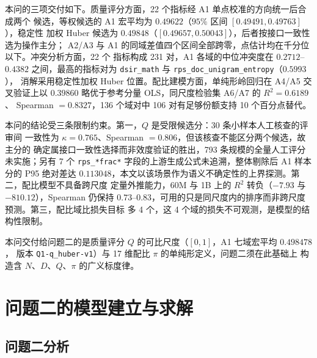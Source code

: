 \documentclass[bwprint]{gmcmthesis}
\numberwithin{equation}{section}
\numberwithin{figure}{section}
\numberwithin{table}{section}
\begin{document}
本问的三项交付如下。质量评分方面，22 个指标经 A1 单点校准的方向统一后合成两个
候选，等权候选的 A1 宏平均为 $0.49622$（$95\%$ 区间 $[0.49491,0.49763]$），稳定性
加权 Huber 候选为 $0.49848$（$[0.49657,0.50043]$），后者按接口一致性选为操作主分；
A2/A3 与 A1 的同域差值四个区间全部跨零，点估计均在千分位以下。冲突分析方面，22 个
指标构成 231 对，A1 各域的中位冲突度在 $0.2712$--$0.4382$ 之间，最高的指标对为
\texttt{dsir\_math} 与 \texttt{rps\_doc\_unigram\_\allowbreak entropy}（$0.5993$），
消解采用稳定性加权 Huber 位置。配比建模方面，单纯形岭回归在 A4/A5 交叉验证上以
$0.39860$ 略优于参考分量 OLS，同尺度检验集 A6/A7 的 $R^2=0.6189$、
Spearman $=0.8327$，136 个域对中 106 对有足够份额支持 10 个百分点替代。

本问的结论受三条限制约束。第一，$Q$ 是受限候选分：30 条小样本人工核查的评审间
一致性为 $\kappa=0.765$、Spearman $=0.806$，但该核查不能区分两个候选，故主分的
确定属接口一致性选择而非效度验证的胜出，793 条规模的全量人工评分未实施；另有 7 个
\texttt{rps\_*frac*} 字段的上游生成公式未追溯，整体剔除后 A1 样本分的 P95 绝对差达
$0.113048$，本文以该场景作为语义不确定性的上界探测。第二，配比模型不具备跨尺度
定量外推能力，60M 与 1B 上的 $R^2$ 转负（$-7.93$ 与 $-810.12$），Spearman 仍保持
$0.73$--$0.83$，可用的只是同尺度内的排序而非跨尺度预测。第三，配比域比损失目标
多 4 个，这 4 个域的损失不可观测，是模型的结构性限制。

本问交付给问题二的是质量评分 $Q$ 的可比尺度（$[0,1]$，A1 七域宏平均 $0.498478$，
版本 \texttt{Q1-q\_huber-v1}）与 17 维配比 $\pi$ 的单纯形定义，问题二须在此基础上
构造含 $N$、$D$、$Q$、$\pi$ 的广义标度律。
\clearpage
\section{问题二的模型建立与求解}



\subsection{问题二分析}
\end{document}
